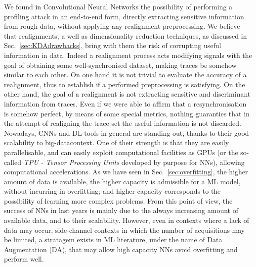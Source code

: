 We found in Convolutional Neural Networks the possibility of performing a profiling attack in an end-to-end form, directly extracting sensitive information from rough data, without applying any realignment preprocessing. We believe that realignments, a well as dimensionality reduction techniques, as discussed in Sec.~\ref{sec:KDAdrawbacks}, bring with them the risk of corrupting useful information in data. Indeed a realignment process acts modifying signals with the goal of obtaining some well-synchronised dataset, making traces be somehow similar to each other. On one hand it is not trivial to evaluate the accuracy of a realignment, thus to establish if a performed preprocessing is satisfying. On the other hand, the goal of a realignment is not extracting sensitive and discriminant information from traces. Even if we were able to affirm that a resynchronisation is somehow  perfect, by means of some special metrics, nothing guaranties that in the attempt of realigning the trace set the useful information is not discarded. Nowadays, CNNs and DL tools in general are standing out, thanks to their good scalability to \textquotedbl big-data\textquotedbl context. One of their strength is that they are easily parallelisable, and can easily exploit computational facilities as GPUs (or the so-called \emph{TPU - Tensor Processing Units} developed by purpose for NNs), allowing computational accelerations. As we have seen in Sec.~\ref{sec:overfitting}, the higher amount of data is available, the higher capacity is admissible for a ML model, without incurring in overfitting; and higher capacity corresponds to the possibility of learning more complex problems. From this point of view, the success of NNs in last years is mainly due to the always increasing amount of available data, and to their scalability. However, even in contexts where a lack of data may occur, \eg side-channel contexts in which the number of acquisitions may be limited, a stratagem exists in ML literature, under the name of Data Augmentation (DA), that may allow high capacity NNs avoid overfitting and perform well. 

